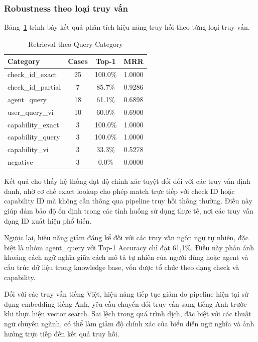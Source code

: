 \subsubsection*{Robustness theo loại truy vấn}

Bảng~\ref{tab:retrieval_category} trình bày kết quả phân tích hiệu năng truy hồi theo từng loại truy vấn.

\begin{table}[!htb]
\centering
\caption{Retrieval theo Query Category}
\label{tab:retrieval_category}
\begin{tabular}{lccc}
\toprule
Category & Cases & Top-1 & MRR \\
\midrule
check\_id\_exact & 25 & 100.0\% & 1.0000 \\
check\_id\_partial & 7 & 85.7\% & 0.9286 \\
agent\_query & 18 & 61.1\% & 0.6898 \\
user\_query\_vi & 10 & 60.0\% & 0.6900 \\
capability\_exact & 3 & 100.0\% & 1.0000 \\
capability\_query & 3 & 100.0\% & 1.0000 \\
capability\_vi & 3 & 33.3\% & 0.5278 \\
negative & 3 & 0.0\% & 0.0000 \\
\bottomrule
\end{tabular}
\end{table}

Kết quả cho thấy hệ thống đạt độ chính xác tuyệt đối đối với các truy vấn định danh, nhờ cơ chế exact lookup cho phép match trực tiếp với check ID hoặc capability ID mà không cần thông qua pipeline truy hồi thông thường. Điều này giúp đảm bảo độ ổn định trong các tình huống sử dụng thực tế, nơi các truy vấn dạng ID xuất hiện phổ biến.

Ngược lại, hiệu năng giảm đáng kể đối với các truy vấn ngôn ngữ tự nhiên, đặc biệt là nhóm agent\_query với Top-1 Accuracy chỉ đạt 61{,}1\%. Điều này phản ánh khoảng cách ngữ nghĩa giữa cách mô tả tự nhiên của người dùng hoặc agent và cấu trúc dữ liệu trong knowledge base, vốn được tổ chức theo dạng check và capability.

Đối với các truy vấn tiếng Việt, hiệu năng tiếp tục giảm do pipeline hiện tại sử dụng embedding tiếng Anh, yêu cầu chuyển đổi truy vấn sang tiếng Anh trước khi thực hiện vector search. Sai lệch trong quá trình dịch, đặc biệt với các thuật ngữ chuyên ngành, có thể làm giảm độ chính xác của biểu diễn ngữ nghĩa và ảnh hưởng trực tiếp đến kết quả truy hồi.

